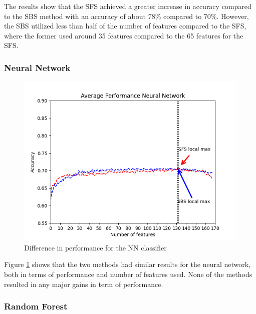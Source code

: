 \documentclass{kththesis}
\begin{document}
The results show that the SFS achieved a greater increase in accuracy compared to the SBS method with an accuracy of about 78\% compared to 70\%. However, the SBS utilized less than half of the number of features compared to the SFS, where the former used around 35 features compared to the 65 features for the SFS.


\subsubsection{Neural Network}

\begin{figure}[h!]
  \begin{center}
    \includegraphics[scale=0.8]{./figures/Figure_1.png}
    \caption{Difference in performance for the NN classifier}
    \label{fig:nn}  %
  \end{center}
\end{figure}

Figure \ref{fig:nn} shows that the two methods had similar results for the neural network, both in terms of performance and number of features used. None of the methods resulted in any major gains in term of performance.

\subsubsection{Random Forest}
\end{document}
